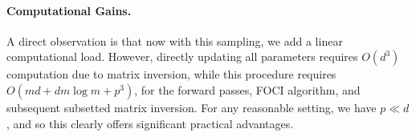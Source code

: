 \paragraph{Computational Gains.}
A direct observation is that now with this sampling, we add a linear computational load.
However, directly updating all parameters requires $O(d^3)$ computation due to matrix inversion, while this procedure requires $O(md + dm\log m + p^3)$, for the forward passes, FOCI algorithm, and subsequent subsetted matrix inversion. For any reasonable setting, we have $p \ll d$, and so this clearly offers significant practical advantages.











